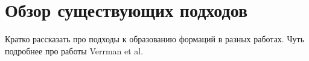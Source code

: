 \chapter{Обзор существующих подходов} 
\label{overview}

Кратко рассказать про подходы к образованию формаций в разных работах.
Чуть подробнее про работы Verrman et al.

\clearpage

